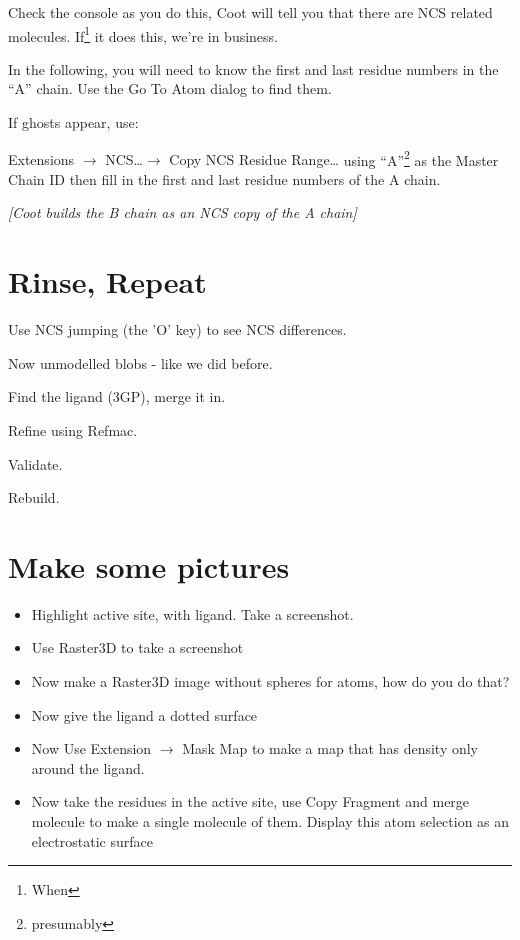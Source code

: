 \documentclass{article}
\begin{document}
Check the console as you do this, Coot will tell you that there are
NCS related molecules.  If\footnote{When} it does this, we're in
business.

In the following, you will need to know the first and last residue
numbers in the ``A'' chain.  Use the Go To Atom dialog to find them.

If ghosts appear, use:

\textsf{Extensions $\rightarrow$ NCS\ldots $\rightarrow$ Copy NCS
  Residue Range\ldots} using ``A''\footnote{presumably} as the Master
Chain ID then fill in the first and last residue numbers of the A
chain.

\textsl{[Coot builds the B chain as an NCS copy of the A chain]}

\section{Rinse, Repeat}

\begin{trivlist}
\item  Use NCS jumping (the 'O' key) to see NCS differences.
\item Now unmodelled blobs - like we did before.
\item Find the ligand (3GP), merge it in.
\item Refine using Refmac.
\item Validate. 
\item Rebuild.
\end{trivlist}


\section{Make some pictures}


  \begin{itemize}
    \item Highlight active site, with ligand.  Take a screenshot.
    \item Use Raster3D to take a screenshot
    \item Now make a Raster3D image without spheres for atoms, how do
      you do that?
    \item Now give the ligand a dotted surface
    \item Now Use \textsf{Extension $\rightarrow$ Mask Map} to make a
      map that has density only around the ligand.
    \item Now take the residues in the active site, use Copy Fragment
      and merge molecule to make a single molecule of them. Display
      this atom selection as an electrostatic surface
  \end{itemize}
\end{document}
